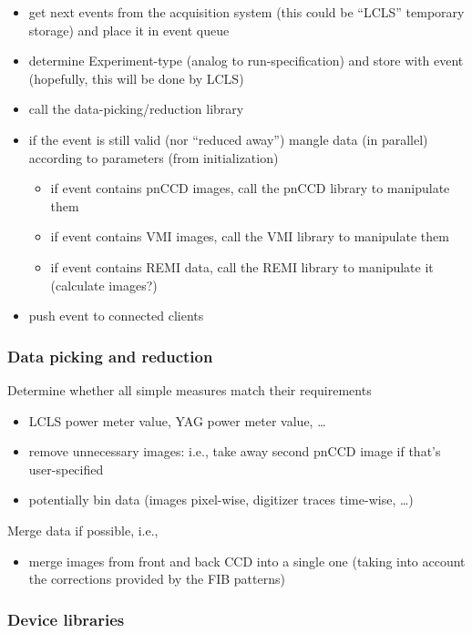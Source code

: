 \documentclass[11pt,a4paper,twoside]{article}
\begin{document}
\begin{itemize}
\item get next events from the acquisition system (this could be ``LCLS'' temporary storage) and
   place it in event queue
\item determine Experiment-type (analog to run-specification) and store with event (hopefully, this
   will be done by LCLS)
\item call the data-picking/reduction library
\item if the event is still valid (nor ``reduced away'') mangle data (in parallel) according to
   parameters (from initialization)
   \begin{itemize}
   \item if event contains pnCCD images, call the pnCCD library to manipulate them
   \item if event contains VMI images, call the VMI library to manipulate them
   \item if event contains REMI data, call the REMI library to manipulate it (calculate images?)
   \end{itemize}
\item push event to connected clients
\end{itemize}


\subsubsection{Data picking and reduction}
\label{sec:data-pick-reduct}

Determine whether all simple measures match their requirements
\begin{itemize}
\item LCLS power meter value, YAG power meter value, \dots
\item remove unnecessary images: i.e., take away second pnCCD image if that's user-specified
\item potentially bin data (images pixel-wise, digitizer traces time-wise, \dots )
\end{itemize}

Merge data if possible, i.e., 

\begin{itemize}
\item merge images from front and back CCD into a single one (taking into account the corrections
   provided by the FIB patterns)
\end{itemize}


\subsubsection{Device libraries}
\label{sec:device-libraries}
\end{document}
